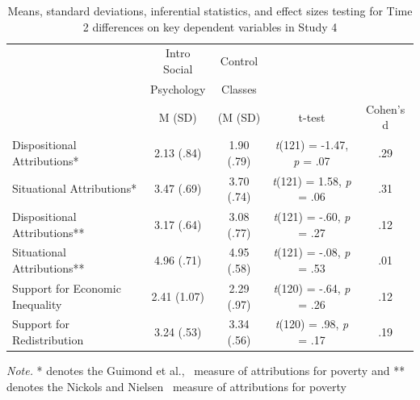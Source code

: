 \documentclass{sfuthesis}
\begin{document}
\begin{table}[h]
  \begin{center}
    \caption{Means, standard deviations, inferential statistics, and effect sizes testing for Time 2 differences on key dependent variables in Study 4}
    \label{tab:twelvthtable}
    \begin{tabular}{l c c c c}
    \hline
      & \multicolumn{1}{c}{Intro Social} & \multicolumn{1}{c}{Control} & & \\
      & \multicolumn{1}{c}{Psychology} & \multicolumn{1}{c}{Classes} & & \\\cmidrule{2-3}
      & \multicolumn{1}{c}{M (SD)} & \multicolumn{1}{c}{(M (SD)} & t-test & Cohen's d\\
      \hline
      Dispositional Attributions* & \multicolumn{1}{c}{2.13 (.84)} & \multicolumn{1}{c}{1.90 (.79)} & \multicolumn{1}{c}{\textit{t}(121) = -1.47, \textit{p} = .07} & .29\\
      Situational Attributions* & \multicolumn{1}{c}{3.47 (.69)} & \multicolumn{1}{c}{3.70 (.74)} & \multicolumn{1}{c}{\textit{t}(121) = 1.58, \textit{p} = .06} & .31\\
      Dispositional Attributions** & \multicolumn{1}{c}{3.17 (.64)} & \multicolumn{1}{c}{3.08 (.77)} & \multicolumn{1}{c}{\textit{t}(121) = -.60, \textit{p} = .27} & .12\\
      Situational Attributions** & \multicolumn{1}{c}{4.96 (.71)} & \multicolumn{1}{c}{4.95 (.58)} & \multicolumn{1}{c}{\textit{t}(121) = -.08, \textit{p} = .53} & .01\\
      Support for Economic Inequality & \multicolumn{1}{c}{2.41 (1.07)} & \multicolumn{1}{c}{2.29 (.97)} & \multicolumn{1}{c}{\textit{t}(120) = -.64, \textit{p} = .26} & .12\\
      Support for Redistribution & \multicolumn{1}{c}{3.24 (.53)} & \multicolumn{1}{c}{3.34 (.56)} & \multicolumn{1}{c}{\textit{t}(120) = .98, \textit{p} = .17} & .19\\
      \hline
    \end{tabular}
  \end{center}
  \textit{Note.} * denotes the Guimond et al.,~\cite{guimond89} measure of attributions for poverty and ** denotes the Nickols and Nielsen~\cite{nickols11} measure of attributions for poverty
\end{table}
\end{document}
